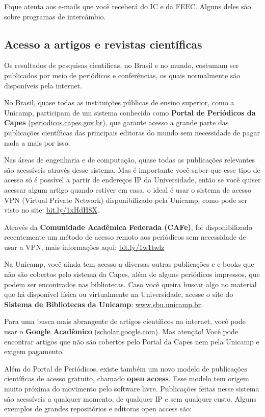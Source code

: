 Fique atenta aos e-mails que você receberá do IC e da FEEC. Alguns deles são
sobre programas de intercâmbio.

\subsection{Acesso a artigos e revistas científicas}

Os resultados de pesquisas científicas, no Brasil e no mundo, costumam ser
publicados por meio de periódicos e conferências, os quais normalmente são
disponíveis pela internet.

No Brasil, quase todas as instituições públicas de ensino superior, como a
Unicamp, participam de um sistema conhecido como \textbf{Portal de Periódicos
da Capes} (\url{periodicos.capes.gov.br}), que garante acesso a grande parte
das publicações científicas das principais editoras do mundo sem necessidade de
pagar nada a mais por isso.

Nas áreas de engenharia e de computação, quase todas as publicações relevantes
são acessíveis através desse sistema. Mas é importante você saber que esse tipo
de acesso só é possível a partir de endereços IP da Universidade, então se você
quiser acessar algum artigo quando estiver em casa, o ideal é usar o sistema de
acesso VPN (Virtual Private Network) disponibilizado pela Unicamp, como pode
ser visto no site: \url{bit.ly/1xHdH8X}.

Através da \textbf{Comunidade Acadêmica Federada (CAFe)}, foi disponibilizado
recentemente um método de acesso remoto aos periódicos sem necessidade de usar
a VPN, mais informações aqui: \url{bit.ly/1w1twlz}

Na Unicamp, você ainda tem acesso a diversas outras publicações e e-books que
não são cobertos pelo sistema da Capes, além de alguns periódicos impressos,
que podem ser encontrados nas bibliotecas. Caso você queira buscar algo no
material que há disponível física ou virtualmente na Universidade, acesse o
site do \textbf{Sistema de Bibliotecas da Unicamp}: \url{www.sbu.unicamp.br}.

Para uma busca mais abrangente de artigos científicos na internet, você pode
usar o \textbf{Google Acadêmico} (\url{scholar.google.com}). Mas atenção! Você
pode encontrar artigos que não são cobertos pelo Portal da Capes nem pela
Unicamp e exigem pagamento.

Além do Portal de Periódicos, existe também um novo modelo de publicações
científicas de acesso gratuito, chamado \textbf{open access}. Esse modelo tem
origem muito próxima do movimento pelo software livre. Publicações feitas nesse
sistema são acessíveis a qualquer momento, de qualquer IP e sem qualquer custo.
Alguns exemplos de grandes repositórios e editoras open access são:

